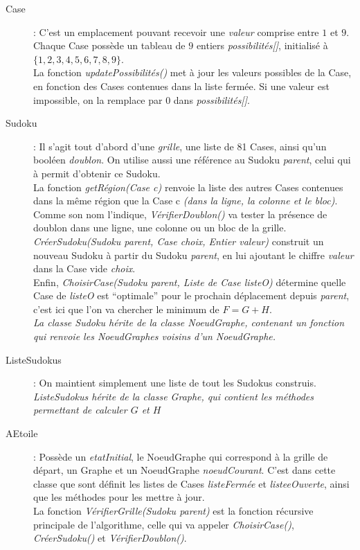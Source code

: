                 \begin{description}
                    \item[Case]: C'est un emplacement pouvant recevoir une \textit{valeur} comprise entre $1$ et $9$. Chaque Case possède un tableau de $9$ entiers \textit{possibilités[]}, initialisé à $\{1,2,3,4,5,6,7,8,9\}$.\\
                        La fonction \textit{updatePossibilités()} met à jour les valeurs possibles de la Case, en fonction des Cases contenues dans la liste fermée. Si une valeur est impossible, on la remplace par $0$ dans \textit{possibilités[]}.
                    \item[Sudoku]: Il s'agit tout d'abord d'une \textit{grille}, une liste de 81 Cases, ainsi qu'un booléen \textit{doublon}. On utilise aussi une référence au Sudoku \textit{parent}, celui qui à permit d'obtenir ce Sudoku.\\
                        La fonction \textit{getRégion(Case c)} renvoie la liste des autres Cases contenues dans la même région que la Case c \textit{(dans la ligne, la colonne et le bloc)}.\\
                        Comme son nom l'indique, \textit{VérifierDoublon()} va tester la présence de doublon dans une ligne, une colonne ou un bloc de la grille.\\
                        \textit{CréerSudoku(Sudoku parent, Case choix, Entier valeur)} construit un nouveau Sudoku à partir du Sudoku \textit{parent}, en lui ajoutant le chiffre \textit{valeur} dans la Case vide \textit{choix}.\\
                        Enfin, \textit{ChoisirCase(Sudoku parent, Liste de Case listeO)} détermine quelle Case de \textit{listeO} est ``optimale'' pour le prochain déplacement depuis \textit{parent}, c'est ici que l'on va chercher le minimum de $F=G+H$.\\
                    \textit{La classe Sudoku hérite de la classe NoeudGraphe, contenant un fonction qui renvoie les NoeudGraphes voisins d'un NoeudGraphe.}
                        \item[ListeSudokus]: On maintient simplement une liste de tout les Sudokus construis.\\
                    \textit{ListeSudokus hérite de la classe Graphe, qui contient les méthodes permettant de calculer $G$ et $H$}
                    \item[AEtoile]: Possède un \textit{etatInitial}, le NoeudGraphe qui correspond à la grille de départ, un Graphe et un NoeudGraphe \textit{noeudCourant}. C'est dans cette classe que sont définit les listes de Cases \textit{listeFermée} et \textit{listeeOuverte}, ainsi que les méthodes pour les mettre à jour.\\
                        La fonction \textit{VérifierGrille(Sudoku parent)} est la fonction récursive principale de l'algorithme, celle qui va appeler \textit{ChoisirCase()}, \textit{CréerSudoku()} et \textit{VérifierDoublon()}.
                \end{description}
